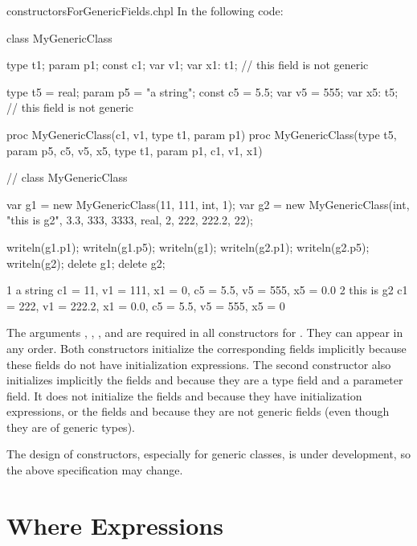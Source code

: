 \begin{chapelexample}{constructorsForGenericFields.chpl}
In the following code:
\begin{chapel}
class MyGenericClass {
  type t1;
  param p1;
  const c1;
  var v1;
  var x1: t1; // this field is not generic

  type t5 = real;
  param p5 = "a string";
  const c5 = 5.5;
  var v5 = 555;
  var x5: t5; // this field is not generic

  proc MyGenericClass(c1, v1, type t1, param p1) { }
  proc MyGenericClass(type t5, param p5, c5, v5, x5,
                     type t1, param p1, c1, v1, x1) { }
}  // class MyGenericClass

var g1 = new MyGenericClass(11, 111, int, 1);
var g2 = new MyGenericClass(int, "this is g2", 3.3, 333, 3333,
                            real, 2, 222, 222.2, 22);
\end{chapel}
\begin{chapelpost}
writeln(g1.p1);
writeln(g1.p5);
writeln(g1);
writeln(g2.p1);
writeln(g2.p5);
writeln(g2);
delete g1;
delete g2;
\end{chapelpost}
\begin{chapeloutput}
1
a string
{c1 = 11, v1 = 111, x1 = 0, c5 = 5.5, v5 = 555, x5 = 0.0}
2
this is g2
{c1 = 222, v1 = 222.2, x1 = 0.0, c5 = 5.5, v5 = 555, x5 = 0}
\end{chapeloutput}
The arguments , , , and  are
required in all constructors for . They can appear
in any order. Both  constructors initialize the
corresponding fields implicitly because these fields do not have initialization
expressions. The second constructor also initializes implicitly
the fields  and  because they are a type field
and a parameter field. It does not initialize the fields 
and  because they have initialization expressions, or
the fields  and  because they are not generic fields
(even though they are of generic types).
\end{chapelexample}

\begin{openissue}
The design of constructors, especially for generic classes, is
under development, so the above specification may change.
\end{openissue}

\section{Where Expressions}
\label{Where_Expressions}

